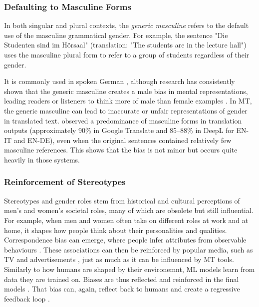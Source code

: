 \subsubsection{Defaulting to Masculine Forms}
In both singular and plural contexts, the \textit{generic masculine} refers to the default use of the masculine grammatical gender.
For example, the sentence "Die Studenten sind im Hörsaal" (translation: "The students are in the lecture hall") uses the masculine plural form to refer to a group of students regardless of their gender.

It is commonly used in spoken German \citep{lardelliBuildingBridgesDataset2024,schmitzGermanAllProfessors2022}, although research has consistently shown that the generic masculine creates a male bias in mental representations, leading readers or listeners to think more of male than female examples \citep{sczesnyCanGenderFairLanguage2016}. In MT, the generic masculine can lead to inaccurate or unfair representations of gender in translated text. \citet{rescignoGenderBiasMachine2023} observed a predominance of masculine forms in translation outputs (approximately 90\% in Google Translate and 85–88\% in DeepL for EN-IT and EN-DE), even when the original sentences contained relatively few masculine references. This shows that the bias is not minor but occurs quite heavily in those systems.


\subsubsection{Reinforcement of Stereotypes}
Stereotypes and gender roles stem from historical and cultural perceptions of men's and women's societal roles, many of which are obsolete but still influential. For example, when men and women often take on different roles at work and at home, it shapes how people think about their personalities and qualities. Correspondence bias can emerge, where people infer attributes from observable behaviours \citep{godsilEffectsGenderRoles2016}. These associations can then be reinforced by popular media, such as TV and advertisements \citep{godsilEffectsGenderRoles2016}, just as much as it can be influenced by MT tools. Similarly to how humans are shaped by their environemnt, ML models learn from data they are trained on. Biases are thus reflected and reinforced in the final models \citep{stanczakSurveyGenderBias2021,smacchiaDoesAIReflect2024}. That bias can, again, reflect back to humans and create a regressive feedback loop \citep{barclayInvestigatingMarkersDrivers2024a,shresthaExploringGenderBiases2022}. 

